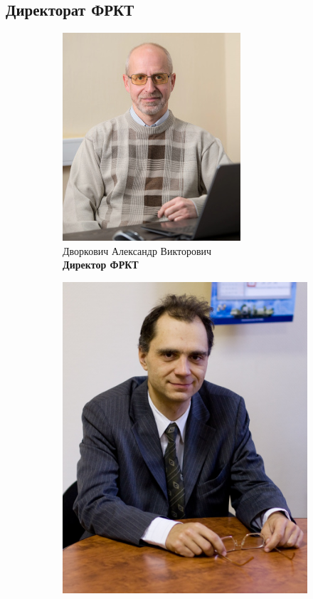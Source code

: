 \documentclass[14pt]{extarticle}
\begin{document}
\subsection{Директорат ФРКТ}
\begin{figure}[h!]
\captionsetup[subfigure]{labelformat=empty,justification=centering,textfont=normalfont}
\captionsetup{labelformat=empty,justification=centering,textfont=normalfont}
    \begin{subfigure}[b]{0.5\linewidth}
        \centering
        \includegraphics[width=0.65\linewidth]{resources/dvork.jpg}
        \caption{Дворкович Александр Викторович \\ \textbf{Директор ФРКТ}}
    \end{subfigure}
    \begin{subfigure}[b]{0.5\linewidth}
        \centering
        \includegraphics[width=0.65\linewidth]{resources/russk.jpg}

\end{subfigure}
\end{figure}
\end{document}
